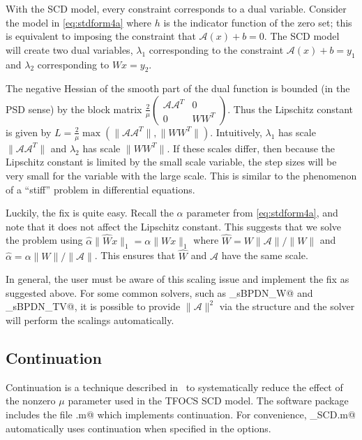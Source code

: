 \documentclass{article}
\newcommand{\cA}{\ensuremath{\mathcal{A}}}    %
\newcommand{\<}{\langle}
\renewcommand{\>}{\rangle}
\begin{document}
With the SCD model, every constraint corresponds to a dual variable.
Consider the model in \eqref{eq:stdform4a} where $h$ is the indicator function
of the zero set; this is equivalent to imposing the constraint that $\cA(x)+b=0$.
The SCD model will create two dual variables, $\lambda_1$ corresponding to
the constraint $\cA(x)+b=y_1$ and $\lambda_2$ corresponding to $Wx=y_2$.

The negative Hessian of the smooth part of the dual function is bounded (in the PSD sense)
by the block matrix $ \frac{2}{\mu} \begin{pmatrix} \cA\cA^T & 0 \\ 0 & WW^T \end{pmatrix}$.
    Thus the Lipschitz constant is given by $L = \frac{2}{\mu}\max( \|\cA\cA^T\|, \|WW^T\| )$.
Intuitively, $\lambda_1$ has scale $\|\cA\cA^T\|$ and $\lambda_2$ has scale $\|WW^T\|$.
If these scales differ, then because the Lipschitz constant is limited by the small scale variable,
the step sizes will be very small for the variable with the large scale.  This is similar
to the phenomenon of a ``stiff'' problem in differential equations.

Luckily, the fix is quite easy.  Recall the $\alpha$ parameter from \eqref{eq:stdform4a}, and
note that it does not affect the Lipschitz constant.  This suggests that we solve
the problem using $\hat{\alpha}\|\hat{W}x\|_1 = \alpha \|Wx\|_1$ where
$\hat{W} = W \|\cA\|/\|W\|$ and $\hat{\alpha} = \alpha \|W\|/\|\cA\| $.
This ensures that $\hat{W}$ and $\cA$ have the same scale.

In general, the user must be aware of this scaling issue and implement the fix as suggested above.
For some common solvers, such as \verb@solver_sBPDN_W@ and \verb@solver_sBPDN_TV@,
it is possible to provide $\|\cA\|^2$ via the \verb@opts@ structure and the solver
will perform the scalings automatically.

\subsection{Continuation}
\label{sec:continuation}

Continuation is a technique described in~\cite{TFOCS} 
to systematically reduce the effect of the nonzero $\mu$
parameter used in the TFOCS SCD model.  The software package
includes the file \verb@continuation.m@ which implements continuation.
For convenience, \verb@tfocs_SCD.m@ automatically uses continuation
when specified in the options.
\end{document}

